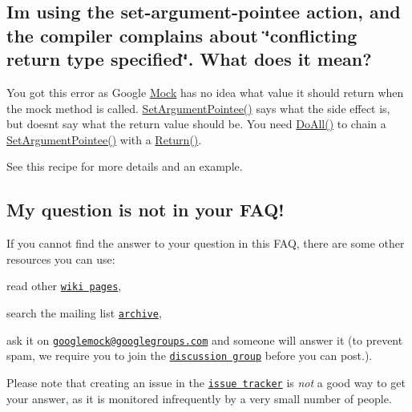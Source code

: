 \subsection*{I\textquotesingle{}m using the set-\/argument-\/pointee action, and the compiler complains about \char`\"{}conflicting return type specified\char`\"{}. What does it mean?}

You got this error as Google \hyperlink{class_mock}{Mock} has no idea what value it should return when the mock method is called. {\ttfamily \hyperlink{namespacetesting_a03b315d27c91a8e719f2b6c09964130b}{Set\+Argument\+Pointee()}} says what the side effect is, but doesn\textquotesingle{}t say what the return value should be. You need {\ttfamily \hyperlink{namespacetesting_a5f533932753d2af95000e96c4a3042e3}{Do\+All()}} to chain a {\ttfamily \hyperlink{namespacetesting_a03b315d27c91a8e719f2b6c09964130b}{Set\+Argument\+Pointee()}} with a {\ttfamily \hyperlink{namespacetesting_af6d1c13e9376c77671e37545cd84359c}{Return()}}.

See this recipe for more details and an example.

\subsection*{My question is not in your F\+A\+Q!}

If you cannot find the answer to your question in this F\+AQ, there are some other resources you can use\+:


\begin{DoxyEnumerate}
\item read other \href{http://code.google.com/p/googlemock/w/list}{\tt wiki pages},
\end{DoxyEnumerate}
\begin{DoxyEnumerate}
\item search the mailing list \href{http://groups.google.com/group/googlemock/topics}{\tt archive},
\end{DoxyEnumerate}
\begin{DoxyEnumerate}
\item ask it on \href{mailto:googlemock@googlegroups.com}{\tt googlemock@googlegroups.\+com} and someone will answer it (to prevent spam, we require you to join the \href{http://groups.google.com/group/googlemock}{\tt discussion group} before you can post.).
\end{DoxyEnumerate}

Please note that creating an issue in the \href{http://code.google.com/p/googlemock/issues/list}{\tt issue tracker} is {\itshape not} a good way to get your answer, as it is monitored infrequently by a very small number of people.

